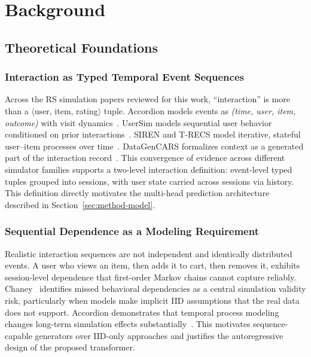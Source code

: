 \documentclass[sigconf,nonacm]{acmart}
\begin{document}
\section{Background}
\label{sec:background}

\subsection{Theoretical Foundations}
\label{sec:theory}

\subsubsection{Interaction as Typed Temporal Event Sequences}
Across the RS simulation papers reviewed for this work, ``interaction'' is
more than a $\langle$user, item, rating$\rangle$ tuple. Accordion models
events as
\textit{(time, user, item, outcome)} with visit
dynamics~\cite{mcinerney2021accordion}. UserSim models sequential user
behavior conditioned on prior interactions~\cite{zhao2021usersim}. SIREN and
T-RECS model iterative, stateful user--item processes over
time~\cite{bountouridis2019siren,lucherini2021trecs}. DataGenCARS formalizes
context as a generated part of the interaction
record~\cite{delcarmen2017datacgencars}. This convergence of evidence across
different simulator families supports a two-level interaction definition:
event-level typed tuples grouped into sessions, with user state carried
across sessions via history. This definition directly motivates the
multi-head prediction architecture described in
Section~\ref{sec:method-model}.

\subsubsection{Sequential Dependence as a Modeling Requirement}
Realistic interaction sequences are not independent and identically
distributed events. A user who views an item, then adds it to cart, then
removes it, exhibits session-level dependence that first-order Markov chains
cannot capture reliably. Chaney~\cite{chaney2021challenges} identifies missed
behavioral dependencies as a central simulation validity risk, particularly
when models make implicit IID assumptions that the real data does not
support. Accordion demonstrates that temporal process modeling changes
long-term simulation effects substantially~\cite{mcinerney2021accordion}.
This motivates sequence-capable generators over IID-only approaches and
justifies the autoregressive design of the proposed transformer.
\end{document}
